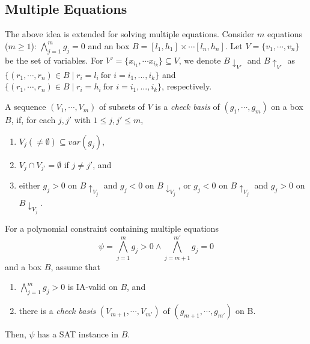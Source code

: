 \documentclass[runningheads,a4paper,oribibl]{llncs}
\newcommand{\suppress}[1]{} %
\begin{document}
\subsection{Multiple Equations}
The above idea is extended for solving multiple equations. 
Consider $m$ equations ($m \ge 1$): $\bigwedge \limits_{j=1}^m g_j = 0$ and 
an box $B = {[l_1, h_1] \times \cdots [l_n, h_n]}$.
Let ${V = \{v_1, \cdots, v_n\}}$ be the set of variables. For $V' = \{x_{i_1}, \cdots x_{i_k} \} \subseteq V$,
we denote $B\downarrow_{V'}$ and $B\uparrow_{V'}$ as $\{ (r_1, \cdots, r_n) \in B \mid r_i = l_i~\text{for }i=i_1,...,i_k \}$
and ${\{ (r_1, \cdots, r_n) \in B \mid r_i = h_i~\text{for }i=i_1,...,i_k \}}$, respectively. 

\begin{definition} \label{def:CheckBasis} 
A sequence $(V_1, \cdots, V_m)$ of subsets of $V$ is a {\em check basis} of $(g_1, \cdots, g_m)$ on a box $B$,
if, for each $j,j'$ with $1 \leq j, j' \leq m$, 
\begin{enumerate}
\item $V_j (\neq \emptyset) \subseteq var(g_j)$, 
\item $V_j \cap V_{j'} = \emptyset$ if $j \neq j'$, and 
\item either $g_j > 0$ on $B\uparrow_{V_j}$ and $g_j < 0$ on $B\downarrow_{V_j}$, or
      $g_j < 0$ on $B\uparrow_{V_j}$ and $g_j > 0$ on $B\downarrow_{V_j}$. 
\end{enumerate}
\end{definition} 
\suppress{
For all $j\in \{1, \cdots, m\}$, let $k_j = |V_j|$ and
${V_j = \{v_{jk} \mid 1 \le k \le k_j \}}$, then, there exist two combinations
${(x_{j1}, \cdots, x_{jk_j}) = (t_{j1}, \cdots, t_{jk_j})}$ and
${(x_{j1}, \cdots, x_{jk_j}) = (t'_{j1}, \cdots, t'_{jk_j})}$
where $t_{jk} \neq t'_{jk} \in (l_{jk}, h_{jk})$, $1 \le k \le k_j$ such that
\[g_j(t_{j1}, \cdots, t_{jk_j}, \cdots, x_{jk}, \cdots) > 0\] and
\[g_j(t'_{j1}, \cdots, t'_{jk_j}, \cdots, x_{jk}, \cdots) < 0\]
for all values of $x_{jk}$ in $(l_{jk}, h_{jk})$ where $x_{jk} \in var(g_j) \setminus V_j$.
We denote $ivt(g_j, V_j, I)$ to represent that the polynomial $g_j$ enjoy this property
with respect to $V_j$ and $I$.
} %

\begin{lemma} \label{lem:multieq}
For a polynomial constraint containing multiple equations \[\psi= 
\bigwedge \limits_{j=1}^m g_j>0 \wedge
\bigwedge \limits_{j=m+1}^{m'} g_j = 0\]
and a box $B$, 
assume that
\begin{enumerate}
\item $\bigwedge \limits_{j=1}^m g_j>0$ is IA-valid on $B$, and
\item there is a {\em check basis} $(V_{m+1}, \cdots, V_{m'})$ of $(g_{m+1}, \cdots, g_{m'})$ on B. 
\end{enumerate}
Then, $\psi$ has a SAT instance in $B$.
\end{lemma}
\end{document}
